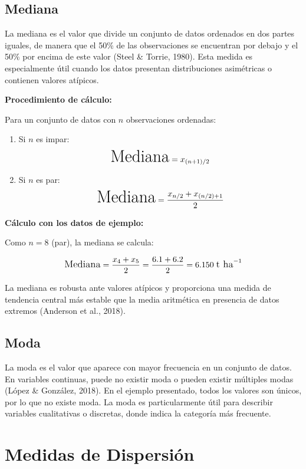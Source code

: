 \documentclass[
  spanish,
  letterpaper,
]{book}
\providecommand{\tightlist}{%
  \setlength{\itemsep}{0pt}\setlength{\parskip}{0pt}}
\begin{document}
\subsection{Mediana}\label{mediana}

La mediana es el valor que divide un conjunto de datos ordenados en dos
partes iguales, de manera que el 50\% de las observaciones se encuentran
por debajo y el 50\% por encima de este valor (Steel \& Torrie, 1980).
Esta medida es especialmente útil cuando los datos presentan
distribuciones asimétricas o contienen valores atípicos.

\textbf{Procedimiento de cálculo:}

Para un conjunto de datos con \(n\) observaciones ordenadas:

\begin{enumerate}
\def\labelenumi{\arabic{enumi}.}
\tightlist
\item
  Si \(n\) es impar:\\
  \[\huge\text{Mediana} = x_{(n+1)/2} \]
\item
  Si \(n\) es par:
  \[\huge\text{Mediana} = \frac{x_{n/2} + x_{(n/2)+1}}{2}\]
\end{enumerate}

\textbf{Cálculo con los datos de ejemplo:}

Como \(n = 8\) (par), la mediana se calcula:

\[\large\text{Mediana} = \frac{x_4 + x_5}{2} = \frac{6.1 + 6.2}{2} = 6.150\; \text{t ha}^{-1}\]

La mediana es robusta ante valores atípicos y proporciona una medida de
tendencia central más estable que la media aritmética en presencia de
datos extremos (Anderson et al., 2018).

\subsection{Moda}\label{moda}

La moda es el valor que aparece con mayor frecuencia en un conjunto de
datos. En variables continuas, puede no existir moda o pueden existir
múltiples modas (López \& González, 2018). En el ejemplo presentado,
todos los valores son únicos, por lo que no existe moda. La moda es
particularmente útil para describir variables cualitativas o discretas,
donde indica la categoría más frecuente.

\section{Medidas de Dispersión}\label{medidas-de-dispersiuxf3n}
\end{document}
